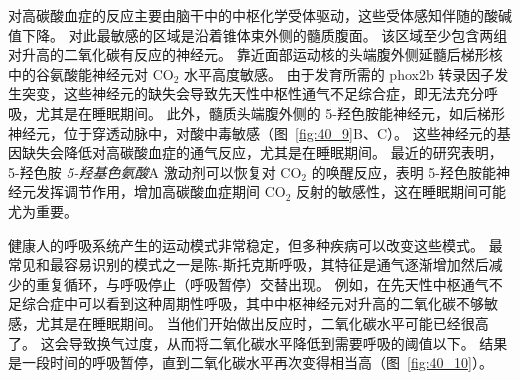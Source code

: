 对高碳酸血症的反应主要由脑干中的中枢化学受体驱动，这些受体感知伴随的酸碱值下降。
对此最敏感的区域是沿着锥体束外侧的髓质腹面。
该区域至少包含两组对升高的二氧化碳有反应的神经元。
靠近面部运动核的头端腹外侧延髓后梯形核中的谷氨酸能神经元对 CO$_2$ 水平高度敏感。
由于发育所需的 phox2b 转录因子发生突变，这些神经元的缺失会导致先天性中枢性通气不足综合症，即无法充分呼吸，尤其是在睡眠期间。
此外，髓质头端腹外侧的 5-羟色胺能神经元，如后梯形神经元，位于穿透动脉中，对酸中毒敏感（图~\ref{fig:40_9}B、C）。
这些神经元的基因缺失会降低对高碳酸血症的通气反应，尤其是在睡眠期间。
最近的研究表明，5-羟色胺 \textit{5-羟基色氨酸}A 激动剂可以恢复对 CO$_2$ 的唤醒反应，表明 5-羟色胺能神经元发挥调节作用，增加高碳酸血症期间 CO$_2$ 反射的敏感性，这在睡眠期间可能尤为重要。


健康人的呼吸系统产生的运动模式非常稳定，但多种疾病可以改变这些模式。
最常见和最容易识别的模式之一是陈-斯托克斯呼吸，其特征是通气逐渐增加然后减少的重复循环，与呼吸停止（呼吸暂停）交替出现。
例如，在先天性中枢通气不足综合症中可以看到这种周期性呼吸，其中中枢神经元对升高的二氧化碳不够敏感，尤其是在睡眠期间。 当他们开始做出反应时，二氧化碳水平可能已经很高了。
这会导致换气过度，从而将二氧化碳水平降低到需要呼吸的阈值以下。
结果是一段时间的呼吸暂停，直到二氧化碳水平再次变得相当高（图~\ref{fig:40_10}）。


